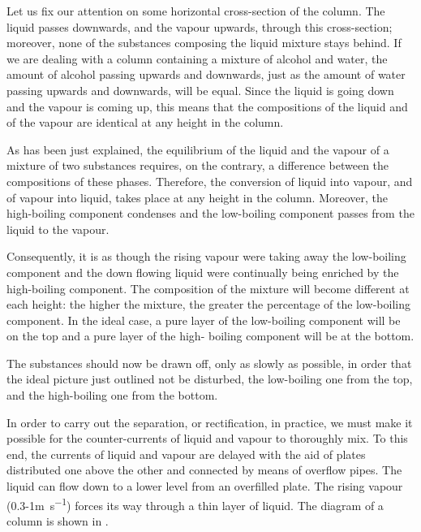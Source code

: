 Let us fix our attention on some horizontal cross-section of the column. The liquid passes downwards, and the vapour upwards, through this cross-section; moreover, none of the substances composing the liquid mixture stays behind. If we are dealing with a column containing a mixture of alcohol and water, the amount of alcohol passing upwards and downwards, just as the amount of water passing upwards and downwards, will be equal. Since the liquid is going down and the vapour is coming up, this means that the compositions of the liquid and of the vapour are identical at any height in the column.

As has been just explained, the equilibrium of the liquid and the vapour of a mixture of two substances requires, on the contrary, a difference between the composi­tions of these phases. Therefore, the conversion of liquid into vapour, and of vapour into liquid, takes place at any height in the column. Moreover, the high-boiling compo­nent condenses and the low-boiling component passes from the liquid to the vapour.

Consequently, it is as though the rising vapour were taking away the low-boiling component and the down­ flowing liquid were continually being enriched by the high-boiling component. The composition of the mixture will become different at each height: the higher the mixture, the greater the percentage of the low-boiling com­ponent. In the ideal case, a pure layer of the low-boiling component will be on the top and a pure layer of the high- boiling component will be at the bottom.

The substances should now be drawn off, only as slowly as possible, in order that the ideal picture just outlined not be disturbed, the low-boiling one from the top, and the high-boiling one from the bottom.

In order to carry out the separation, or rectification, in practice, we must make it possible for the counter-cur­rents of liquid and vapour to thoroughly mix. To this end, the currents of liquid and vapour are delayed with the aid of plates distributed one above the other and connected by means of overflow pipes. The liquid can flow down to a lower level from an overfilled plate. The rising vapour (0.3-1\si{\meter\per\second}) forces its way through a thin layer of liquid. The diagram of a column is shown in .

